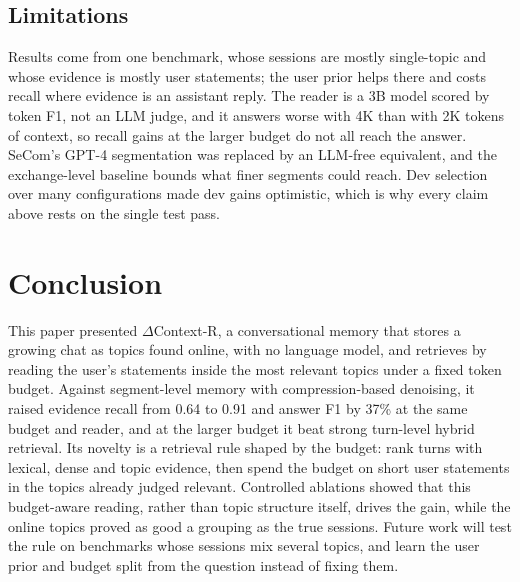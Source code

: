 \documentclass[conference]{IEEEtran}
\newcommand{\dcr}{$\Delta$Context-R}
\begin{document}
\subsection{Limitations}
Results come from one benchmark, whose sessions are mostly single-topic and
whose evidence is mostly user statements; the user prior helps there and costs
recall where evidence is an assistant reply. The reader is a 3B model scored by
token F1, not an LLM judge, and it answers worse with 4K than with 2K tokens of
context, so recall gains at the larger budget do not all reach the answer.
SeCom's GPT-4 segmentation was replaced by an
LLM-free equivalent, and the exchange-level baseline bounds what finer segments
could reach. Dev selection over many configurations made dev gains optimistic,
which is why every claim above rests on the single test pass.

\section{Conclusion}
\label{sec:concl}
This paper presented \dcr{}, a conversational memory that stores a growing chat
as topics found online, with no language model, and retrieves by reading the
user's statements inside the most relevant topics under a fixed token budget.
Against segment-level memory with compression-based denoising, it raised
evidence recall from 0.64 to 0.91 and answer F1 by 37\% at the same budget and
reader, and at the larger budget it beat strong turn-level hybrid retrieval.
Its novelty is a retrieval rule shaped by the budget: rank turns with lexical,
dense and topic evidence, then spend the budget on short user statements in the
topics already judged relevant. Controlled ablations showed that this
budget-aware reading, rather than topic structure itself, drives the gain,
while the online topics proved as good a grouping as the true sessions. Future
work will test the rule on benchmarks whose sessions mix several topics, and
learn the user prior and budget split from the question instead of fixing them.
\end{document}
